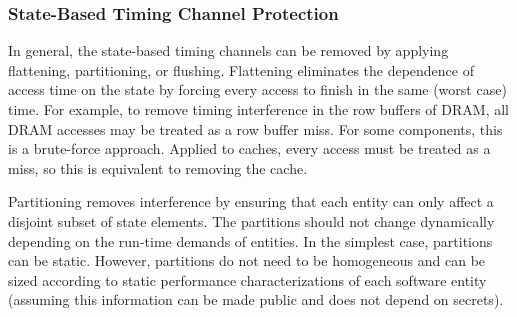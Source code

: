 \subsubsection{State-Based Timing Channel Protection}

In general, the state-based 
timing channels can be removed by applying flattening, partitioning, or 
flushing.
Flattening eliminates the dependence of access time on the state by forcing 
every access to finish in the same (worst case) time. For example, to remove timing 
interference in the row buffers of DRAM, all DRAM accesses may be treated as 
a row buffer miss.
For some components, this is a 
brute-force approach. Applied to caches, every access must be treated as a 
miss, so this is equivalent to removing the cache. 

Partitioning removes interference by ensuring that each entity can
only affect a disjoint subset of state elements. The partitions
should not change dynamically depending on the run-time demands of entities.
In the simplest case, partitions can be static.
However, partitions do not need to be homogeneous and can be sized according 
to static performance characterizations of each software entity (assuming this 
information can be made public and does not depend on secrets).


